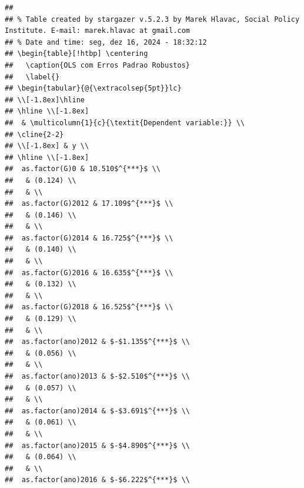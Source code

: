 \documentclass[
]{article}
\begin{document}
\begin{verbatim}
## 
## % Table created by stargazer v.5.2.3 by Marek Hlavac, Social Policy Institute. E-mail: marek.hlavac at gmail.com
## % Date and time: seg, dez 16, 2024 - 18:32:12
## \begin{table}[!htbp] \centering 
##   \caption{OLS com Erros Padrao Robustos} 
##   \label{} 
## \begin{tabular}{@{\extracolsep{5pt}}lc} 
## \\[-1.8ex]\hline 
## \hline \\[-1.8ex] 
##  & \multicolumn{1}{c}{\textit{Dependent variable:}} \\ 
## \cline{2-2} 
## \\[-1.8ex] & y \\ 
## \hline \\[-1.8ex] 
##  as.factor(G)0 & 10.510$^{***}$ \\ 
##   & (0.124) \\ 
##   & \\ 
##  as.factor(G)2012 & 17.109$^{***}$ \\ 
##   & (0.146) \\ 
##   & \\ 
##  as.factor(G)2014 & 16.725$^{***}$ \\ 
##   & (0.140) \\ 
##   & \\ 
##  as.factor(G)2016 & 16.635$^{***}$ \\ 
##   & (0.132) \\ 
##   & \\ 
##  as.factor(G)2018 & 16.525$^{***}$ \\ 
##   & (0.129) \\ 
##   & \\ 
##  as.factor(ano)2012 & $-$1.135$^{***}$ \\ 
##   & (0.056) \\ 
##   & \\ 
##  as.factor(ano)2013 & $-$2.510$^{***}$ \\ 
##   & (0.057) \\ 
##   & \\ 
##  as.factor(ano)2014 & $-$3.691$^{***}$ \\ 
##   & (0.061) \\ 
##   & \\ 
##  as.factor(ano)2015 & $-$4.890$^{***}$ \\ 
##   & (0.064) \\ 
##   & \\ 
##  as.factor(ano)2016 & $-$6.222$^{***}$ \\ 

\end{verbatim}
\end{document}
